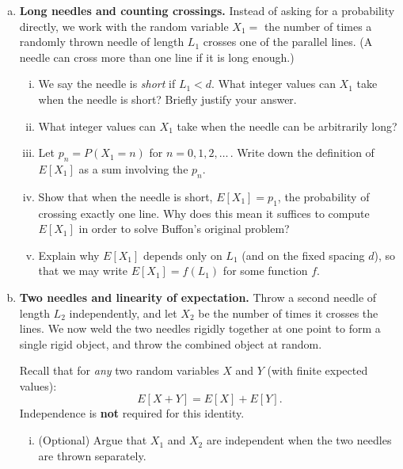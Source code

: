 \documentclass[12pt]{article}
\begin{document}
\begin{enumerate}[(a)]

  \item \textbf{Long needles and counting crossings.}
  Instead of asking for a probability directly, we work with the random
  variable $X_1 =$ the number of times a randomly thrown needle of length
  $L_1$ crosses one of the parallel lines. (A needle can cross more than one
  line if it is long enough.)

  \begin{enumerate}[(i)]
    \item We say the needle is \emph{short} if $L_1 < d$. What integer
      values can $X_1$ take when the needle is short? Briefly justify
      your answer.

    \item What integer values can $X_1$ take when the needle can be
      arbitrarily long?

    \item Let $p_n = P(X_1 = n)$ for $n = 0, 1, 2, \ldots$\,. Write
      down the definition of $E[X_1]$ as a sum involving the $p_n$.

    \item Show that when the needle is short, $E[X_1] = p_1$, the
      probability of crossing exactly one line. Why does this mean it
      suffices to compute $E[X_1]$ in order to solve Buffon's original
      problem?

    \item Explain why $E[X_1]$ depends only on $L_1$ (and on the fixed
      spacing $d$), so that we may write $E[X_1] = f(L_1)$ for some
      function $f$.
  \end{enumerate}

  \item \textbf{Two needles and linearity of expectation.}
  Throw a second needle of length $L_2$ independently, and let $X_2$ be
  the number of times it crosses the lines.  We now weld the two needles
  rigidly together at one point to form a single rigid object, and throw
  the combined object at random.

  Recall that for \emph{any} two random variables $X$ and $Y$ (with finite expected values):
  \[
    E[X + Y] = E[X] + E[Y].
  \]
  Independence is \textbf{not} required for this identity.

  \begin{enumerate}[(i)]
    \item (Optional) Argue that $X_1$ and $X_2$ are independent
      when the two needles are thrown separately.


\end{enumerate}
\end{enumerate}
\end{document}
